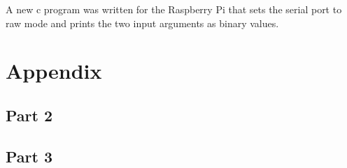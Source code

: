 \documentclass{article}
\begin{document}
A new c program was written for the Raspberry Pi that sets the serial port to raw mode and prints the two input arguments as binary values.

\section*{Appendix}
\appendix
\subsection*{Part 2}\label{appendix:part2}

\subsection*{Part 3}\label{appendix:part3}


\end{document}

